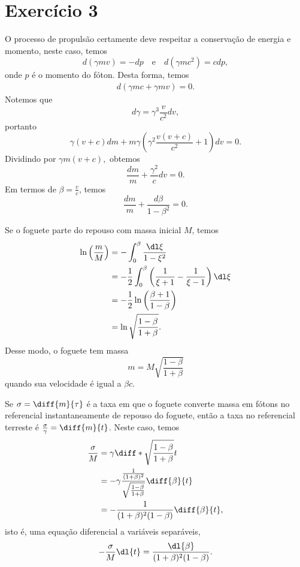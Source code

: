 \section*{Exercício 3}
O processo de propulsão certamente deve respeitar a conservação de energia e momento, neste caso, temos
\begin{equation*}
    d(\gamma mv) = -dp\quad\text{e}\quad d(\gamma mc^2) = c dp,
\end{equation*}
onde \(p\) é o momento do fóton. Desta forma, temos
\begin{align*}
    d\left(\gamma mc + \gamma m v\right) = 0.
\end{align*}
Notemos que
\begin{equation*}
    d \gamma = \gamma^3 \frac{v}{c^2} dv,
\end{equation*}
portanto
\begin{equation*}
    \gamma (v + c) dm + m \gamma \left(\gamma^2\frac{v(v + c)}{c^2} + 1\right) dv = 0.
\end{equation*}
Dividindo por \(\gamma m (v + c),\) obtemos
\begin{equation*}
    \frac{dm}{m} + \frac{\gamma^2}{c}dv = 0.
\end{equation*}
Em termos de \(\beta = \frac{v}{c}\), temos
\begin{equation*}
    \frac{dm}{m} + \frac{d\beta}{1 - \beta^2} = 0.
\end{equation*}

Se o foguete parte do repouso com massa inicial \(M\), temos
\begin{align*}
    \ln{\left(\frac{m}{M}\right)} &= -\int_0^\beta \frac{\dl\xi}{1 - \xi^2}\\
                                  &= -\frac12 \int_0^\beta \left(\frac1{\xi+1} - \frac1{\xi-1}\right)\dl\xi\\
                                  &= -\frac12\ln{\left(\frac{\beta + 1}{1 - \beta}\right)}\\
                                  &= \ln{\sqrt{\frac{1 - \beta}{1+ \beta}}}.
\end{align*}
Desse modo, o foguete tem massa
\begin{equation*}
    m = M\sqrt{\frac{1 - \beta}{1 + \beta}}
\end{equation*}
quando sua velocidade é igual a \(\beta c\).

Se \(\sigma = \diff{m}{\tau}\) é a taxa em que o foguete converte massa em fótons no referencial instantaneamente de repouso do foguete, então a taxa no referencial terreste é \(\frac\sigma\gamma = \diff{m}{t}\). Neste caso, temos
\begin{align*}
    \frac{\sigma}{M} &= \gamma  \diff*{\sqrt{\frac{1 - \beta}{1+\beta}}}{t}\\
                     &= -\gamma  \frac{\frac{1}{(1+\beta)^2}}{\sqrt{\frac{1-\beta}{1+\beta}}}\diff{\beta}{t}\\
                     &= -\frac{1}{(1+\beta)^2(1-\beta)} \diff{\beta}{t},
\end{align*}
isto é, uma equação diferencial a variáveis separáveis,
\begin{equation*}
    -\frac{\sigma}{M} \dl{t} = \frac{\dl{\beta}}{(1+\beta)^2(1-\beta)}.
\end{equation*}

